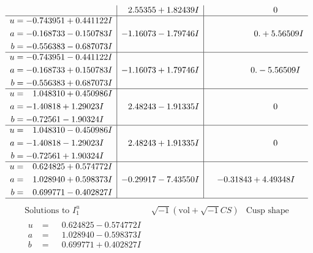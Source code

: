 \documentclass[1p]{elsarticle_modified}
\theoremstyle{definition}
\newcommand{\I}{\sqrt{-1}}
\begin{document}
$$\begin{array}{c|c|c}
 & \phantom{-}2.55355 + 1.82439 I & \phantom{-0.000000 } 0 \\ \hline\begin{aligned}
u &= -0.743951 + 0.441122 I \\
a &= -0.168733 - 0.150783 I \\
b &= -0.556383 - 0.687073 I\end{aligned}
 & -1.16073 - 1.79746 I & \phantom{-0.000000 -}0. + 5.56509 I \\ \hline\begin{aligned}
u &= -0.743951 - 0.441122 I \\
a &= -0.168733 + 0.150783 I \\
b &= -0.556383 + 0.687073 I\end{aligned}
 & -1.16073 + 1.79746 I & \phantom{-0.000000 } 0. - 5.56509 I \\ \hline\begin{aligned}
u &= \phantom{-}1.048310 + 0.450986 I \\
a &= -1.40818 + 1.29023 I \\
b &= -0.72561 - 1.90324 I\end{aligned}
 & \phantom{-}2.48243 - 1.91335 I & \phantom{-0.000000 } 0 \\ \hline\begin{aligned}
u &= \phantom{-}1.048310 - 0.450986 I \\
a &= -1.40818 - 1.29023 I \\
b &= -0.72561 + 1.90324 I\end{aligned}
 & \phantom{-}2.48243 + 1.91335 I & \phantom{-0.000000 } 0 \\ \hline\begin{aligned}
u &= \phantom{-}0.624825 + 0.574772 I \\
a &= \phantom{-}1.028940 + 0.598373 I \\
b &= \phantom{-}0.699771 - 0.402827 I\end{aligned}
 & -0.29917 - 7.43550 I & -0.31843 + 4.49348 I\\
 \hline 
 \end{array}$$\newpage$$\begin{array}{c|c|c}  
\text{Solutions to }I^u_{1}& \I (\text{vol} + \sqrt{-1}CS) & \text{Cusp shape}\\
 \hline 
\begin{aligned}
u &= \phantom{-}0.624825 - 0.574772 I \\
a &= \phantom{-}1.028940 - 0.598373 I \\
b &= \phantom{-}0.699771 + 0.402827 I\end{aligned}

\end{array}$$
\end{document}

